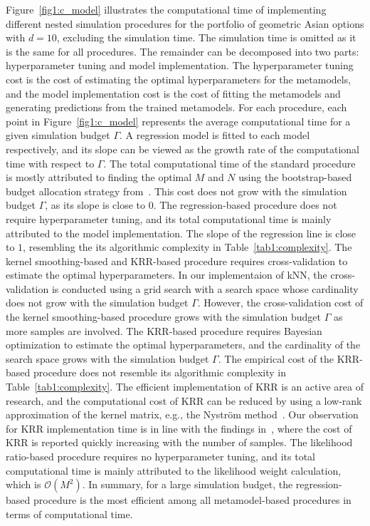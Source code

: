 Figure~\ref{fig1:c_model} illustrates the computational time of implementing different nested simulation procedures for the portfolio of geometric Asian options with $d = 10$, excluding the simulation time.
The simulation time is omitted as it is the same for all procedures.
The remainder can be decomposed into two parts: hyperparameter tuning and model implementation.
The hyperparameter tuning cost is the cost of estimating the optimal hyperparameters for the metamodels, and the model implementation cost is the cost of fitting the metamodels and generating predictions from the trained metamodels.
For each procedure, each point in Figure~\ref{fig1:c_model} represents the average computational time for a given simulation budget $\Gamma$.
A regression model is fitted to each model respectively, and its slope can be viewed as the growth rate of the computational time with respect to $\Gamma$.
The total computational time of the standard procedure is mostly attributed to finding the optimal $M$ and $N$ using the bootstrap-based budget allocation strategy from~\cite{zhang2021bootstrap}.
This cost does not grow with the simulation budget $\Gamma$, as its slope is close to $0$.
The regression-based procedure does not require hyperparameter tuning, and its total computational time is mainly attributed to the model implementation.
The slope of the regression line is close to $1$, resembling the its algorithmic complexity in Table~\ref{tab1:complexity}.
The kernel smoothing-based and KRR-based procedure requires cross-validation to estimate the optimal hyperparameters.
In our implementaion of kNN, the cross-validation is conducted using a grid search with a search space whose cardinality does not grow with the simulation budget $\Gamma$.
However, the cross-validation cost of the kernel smoothing-based procedure grows with the simulation budget $\Gamma$ as more samples are involved.
The KRR-based procedure requires Bayesian optimization to estimate the optimal hyperparameters, and the cardinality of the search space grows with the simulation budget $\Gamma$.
The empirical cost of the KRR-based procedure does not resemble its algorithmic complexity in Table~\ref{tab1:complexity}.
The efficient implementation of KRR is an active area of research, and the computational cost of KRR can be reduced by using a low-rank approximation of the kernel matrix, e.g., the Nystr\"om method~\citep{nystrom1930praktische}.
Our observation for KRR implementation time is in line with the findings in~\cite{scikit-learn}, where the cost of KRR is reported quickly increasing with the number of samples.
The likelihood ratio-based procedure requires no hyperparameter tuning, and its total computational time is mainly attributed to the likelihood weight calculation, which is $\mathcal{O}(M^2)$. 
In summary, for a large simulation budget, the regression-based procedure is the most efficient among all metamodel-based procedures in terms of computational time.

